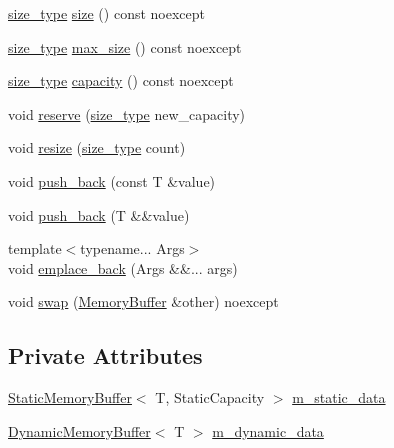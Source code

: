 \begin{DoxyCompactItemize}
\item 
\mbox{\hyperlink{classmage_1_1_memory_buffer_a77b459da2e6f1c57c21467a6eff8e9f9}{size\+\_\+type}} \mbox{\hyperlink{classmage_1_1_memory_buffer_a3a3cbce15e861835a06c558d0707cc09}{size}} () const noexcept
\item 
\mbox{\hyperlink{classmage_1_1_memory_buffer_a77b459da2e6f1c57c21467a6eff8e9f9}{size\+\_\+type}} \mbox{\hyperlink{classmage_1_1_memory_buffer_a2c371f13a0ed5c35f31b4bf857463c49}{max\+\_\+size}} () const noexcept
\item 
\mbox{\hyperlink{classmage_1_1_memory_buffer_a77b459da2e6f1c57c21467a6eff8e9f9}{size\+\_\+type}} \mbox{\hyperlink{classmage_1_1_memory_buffer_aaec3776527d464a2b47f301c08fb0206}{capacity}} () const noexcept
\item 
void \mbox{\hyperlink{classmage_1_1_memory_buffer_ac1aa17aac0bb038ed0f2a2271b6bb747}{reserve}} (\mbox{\hyperlink{classmage_1_1_memory_buffer_a77b459da2e6f1c57c21467a6eff8e9f9}{size\+\_\+type}} new\+\_\+capacity)
\item 
void \mbox{\hyperlink{classmage_1_1_memory_buffer_aee1f82e6b01a4f7ba7843415cd4bc758}{resize}} (\mbox{\hyperlink{classmage_1_1_memory_buffer_a77b459da2e6f1c57c21467a6eff8e9f9}{size\+\_\+type}} count)
\item 
void \mbox{\hyperlink{classmage_1_1_memory_buffer_a58fa7b8f32f83d85d84037acc41add92}{push\+\_\+back}} (const T \&value)
\item 
void \mbox{\hyperlink{classmage_1_1_memory_buffer_a5fe95cfae4c8d260f4a7af03b2999cf4}{push\+\_\+back}} (T \&\&value)
\item 
{\footnotesize template$<$typename... Args$>$ }\\void \mbox{\hyperlink{classmage_1_1_memory_buffer_a6731a9292681e7b348bf91171cd967a3}{emplace\+\_\+back}} (Args \&\&... args)
\item 
void \mbox{\hyperlink{classmage_1_1_memory_buffer_aa5aa6345b6aed3b34ac52b98b290a432}{swap}} (\mbox{\hyperlink{classmage_1_1_memory_buffer}{Memory\+Buffer}} \&other) noexcept
\end{DoxyCompactItemize}
\subsection*{Private Attributes}
\begin{DoxyCompactItemize}
\item 
\mbox{\hyperlink{classmage_1_1_static_memory_buffer}{Static\+Memory\+Buffer}}$<$ T, Static\+Capacity $>$ \mbox{\hyperlink{classmage_1_1_memory_buffer_a34c3523ef28317cf3b5b01c06bc25ae5}{m\+\_\+static\+\_\+data}}
\item 
\mbox{\hyperlink{classmage_1_1_dynamic_memory_buffer}{Dynamic\+Memory\+Buffer}}$<$ T $>$ \mbox{\hyperlink{classmage_1_1_memory_buffer_af4b252551b0e89ab286dcc07efc69ec8}{m\+\_\+dynamic\+\_\+data}}
\end{DoxyCompactItemize}


